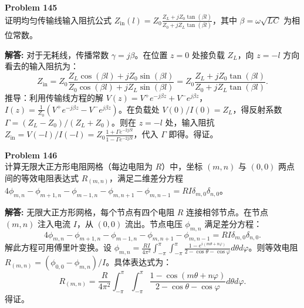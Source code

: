 \documentclass[12pt, a4paper, oneside]{ctexart}
\newenvironment{solution}{\par\noindent\textbf{解答:}\quad}{\par}
\begin{document}
\begin{mdframed}[backgroundcolor=gray!10, linewidth=0pt]
    \textbf{Problem 145} \\
    证明均匀传输线输入阻抗公式 $Z_{\text{in}}(l) = Z_0 \frac{Z_L + j Z_0 \tan(\beta l)}{Z_0 + j Z_L \tan(\beta l)}$，其中 $\beta = \omega \sqrt{LC}$ 为相位常数。
\end{mdframed}
\begin{solution}
    对于无耗线，传播常数 $\gamma = j\beta$。在位置 $z=0$ 处接负载 $Z_L$，向 $z=-l$ 方向看去的输入阻抗为：
    \[
    Z_{\text{in}} = Z_0 \frac{Z_L \cos(\beta l) + j Z_0 \sin(\beta l)}{Z_0 \cos(\beta l) + j Z_L \sin(\beta l)} = Z_0 \frac{Z_L + j Z_0 \tan(\beta l)}{Z_0 + j Z_L \tan(\beta l)}.
    \]
    推导：利用传输线方程的解 $V(z) = V^+ e^{-j\beta z} + V^- e^{j\beta z}$，$I(z) = \frac{1}{Z_0}(V^+ e^{-j\beta z} - V^- e^{j\beta z})$。在负载处 $V(0)/I(0)=Z_L$，得反射系数 $\Gamma = (Z_L - Z_0)/(Z_L + Z_0)$。则在 $z=-l$ 处，输入阻抗 $Z_{\text{in}} = V(-l)/I(-l) = Z_0 \frac{1+\Gamma e^{-2j\beta l}}{1-\Gamma e^{-2j\beta l}}$，代入 $\Gamma$ 即得。得证。
\end{solution}

\begin{mdframed}[backgroundcolor=gray!10, linewidth=0pt]
    \textbf{Problem 146} \\
    计算无限大正方形电阻网格（每边电阻为 $R$）中，坐标 $(m,n)$ 与 $(0,0)$ 两点间的等效电阻表达式 $R_{(m,n)}$，满足二维差分方程 $4\phi_{m,n} - \phi_{m+1,n} - \phi_{m-1,n} - \phi_{m,n+1} - \phi_{m,n-1} = R I \delta_{m,0} \delta_{n,0}$。
\end{mdframed}
\begin{solution}
    无限大正方形网格，每个节点有四个电阻 $R$ 连接相邻节点。在节点 $(m,n)$ 注入电流 $I$，从 $(0,0)$ 流出。节点电压 $\phi_{m,n}$ 满足差分方程：
    \[
    4\phi_{m,n} - \phi_{m+1,n} - \phi_{m-1,n} - \phi_{m,n+1} - \phi_{m,n-1} = R I \delta_{m,0} \delta_{n,0}.
    \]
    解此方程可用傅里叶变换。设 $\phi_{m,n} = \frac{RI}{4\pi^2} \int_{-\pi}^{\pi} \int_{-\pi}^{\pi} \frac{1 - e^{i(m\theta + n\varphi)}}{2 - \cos\theta - \cos\varphi} d\theta d\varphi$。则等效电阻 $R_{(m,n)} = (\phi_{0,0} - \phi_{m,n})/I$。具体表达式为：
    \[
    R_{(m,n)} = \frac{R}{4\pi^2} \int_{-\pi}^{\pi} \int_{-\pi}^{\pi} \frac{1 - \cos(m\theta + n\varphi)}{2 - \cos\theta - \cos\varphi} d\theta d\varphi.
    \]
    得证。
\end{solution}
\end{document}
